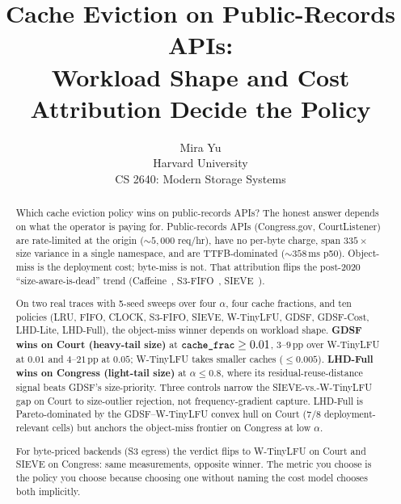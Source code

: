 \documentclass[letterpaper,twocolumn,10pt]{article}
\newcommand{\code}[1]{\texttt{\small #1}}
\begin{document}

\date{}

\title{\Large \bf Cache Eviction on Public-Records APIs:\\
Workload Shape and Cost Attribution Decide the Policy}

\author{
{\rm Mira Yu}\\
Harvard University \\
CS 2640: Modern Storage Systems
}

\maketitle

\begin{abstract}
Which cache eviction policy wins on public-records APIs? The
honest answer depends on what the operator is paying for.
Public-records APIs (Congress.gov, CourtListener) are rate-limited
at the origin ($\sim 5{,}000$ req/hr), have no per-byte charge,
span $335\times$ size variance in a single namespace, and are
TTFB-dominated ($\sim 358$\,ms p50). Object-miss is the
deployment cost; byte-miss is not. That attribution flips
the post-2020 ``size-aware-is-dead'' trend
(Caffeine~\cite{caffeine2024}, S3-FIFO~\cite{yang2023fifo},
SIEVE~\cite{zhang2024sieve}).

On two real traces with 5-seed sweeps over four $\alpha$, four cache
fractions, and ten policies (LRU, FIFO, CLOCK, S3-FIFO, SIEVE,
W-TinyLFU, GDSF, GDSF-Cost, LHD-Lite, LHD-Full), the object-miss
winner depends on workload shape. \textbf{GDSF wins on Court
(heavy-tail size)} at $\code{cache\_frac} \geq 0.01$, $3$--$9$\,pp
over W-TinyLFU at $0.01$ and $4$--$21$\,pp at $0.05$; W-TinyLFU
takes smaller caches ($\leq 0.005$). \textbf{LHD-Full wins on
Congress (light-tail size)} at $\alpha \leq 0.8$, where its
residual-reuse-distance signal beats GDSF's size-priority. Three
controls narrow the SIEVE-vs.-W-TinyLFU gap on Court to size-outlier
rejection, not frequency-gradient capture. LHD-Full is
Pareto-dominated by the GDSF--W-TinyLFU convex hull on Court ($7/8$
deployment-relevant cells) but anchors the object-miss frontier on
Congress at low $\alpha$.

For byte-priced backends (S3 egress) the verdict flips to W-TinyLFU
on Court and SIEVE on Congress: same measurements, opposite winner.
The metric you choose is the policy you choose because choosing one
without naming the cost model chooses both implicitly.
\end{abstract}
\end{document}
